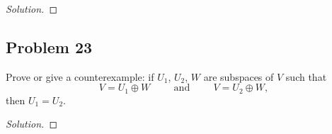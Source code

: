\documentclass[letterpaper, 12pt]{amsart}
\theoremstyle{definition}  %
\begin{document}
		\begin{proof}[Solution]
		\end{proof}

		\subsection*{Problem 23}
		Prove or give a counterexample: if $U_{1}$, $U_{2}$, $W$ are subspaces of $V$ such that	$$V = U_{1} \oplus W \hspace{1cm} \text{and} \hspace{1cm} V = U_{2} \oplus W,$$ then $U_{1} = U_{2}$. 

		\begin{proof}[Solution]
		\end{proof}
\end{document}
